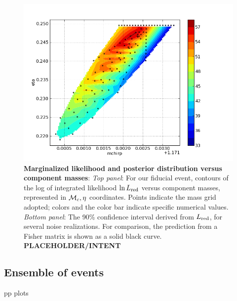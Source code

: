 \documentclass[twocolumn,prd,nofootinbib]{revtex4}
\newcommand\mc{{{\cal M}_c}}
\begin{document}
\begin{figure}
\includegraphics[width=\columnwidth]{../Figures/coinc_id_12635_mchirp_eta_logevidence}
\caption{\textbf{Marginalized likelihood and posterior distribution versus component masses}: \emph{Top panel}: For our fiducial event,
  contours of the log of integrated likelihood $\ln L_{\rm red}$ versus component masses, represented in $\mc,\eta$
  coordinates.  Points indicate the mass grid adopted; colors and the color bar indicate specific numerical values.   
\emph{Bottom panel}: The 90\% confidence interval derived from $L_{\rm red}$, for several noise realizations.  For
comparison, the prediction from a Fisher matrix is shown as a solid black curve.
 \textbf{PLACEHOLDER/INTENT}
}
\end{figure}


\subsection{Ensemble of events}

pp plots
\end{document}
